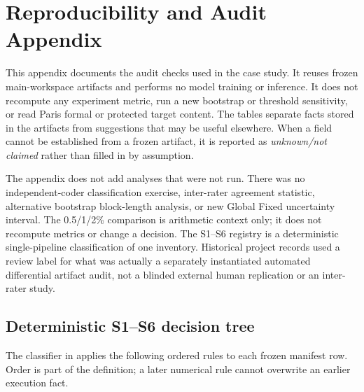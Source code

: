 \appendix
\section{Reproducibility and Audit Appendix}
\label{sec:reproducibility-appendix}

This appendix documents the audit checks used in the case study.  It reuses frozen main-workspace artifacts and performs no model training or inference.  It does not recompute any experiment metric, run a new bootstrap or threshold sensitivity, or read Paris formal or protected target content.  The tables separate facts stored in the artifacts from suggestions that may be useful elsewhere.  When a field cannot be established from a frozen artifact, it is reported as \emph{unknown/not claimed} rather than filled in by assumption.

The appendix does not add analyses that were not run.  There was no independent-coder classification exercise, inter-rater agreement statistic, alternative bootstrap block-length analysis, or new Global Fixed uncertainty interval.  The 0.5/1/2\% comparison is arithmetic context only; it does not recompute metrics or change a decision.  The S1--S6 registry is a deterministic single-pipeline classification of one inventory.  Historical project records used a review label for what was actually a separately instantiated automated differential artifact audit, not a blinded external human replication or an inter-rater study.

\subsection{Deterministic S1--S6 decision tree}
\label{sec:appendix-status-tree}

The classifier in  applies the following ordered rules to each frozen manifest row.  Order is part of the definition; a later numerical rule cannot overwrite an earlier execution fact.

